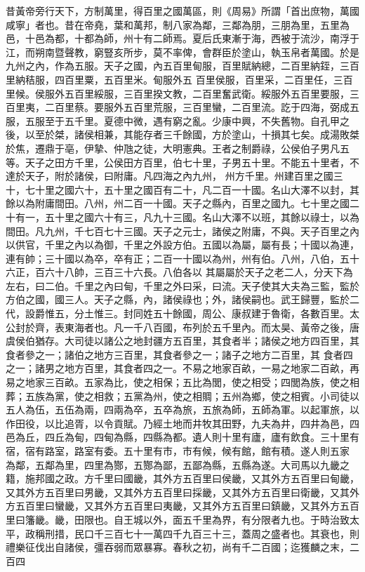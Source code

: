 \begin{pinyinscope}
 昔黃帝旁行天下，方制萬里，得百里之國萬區，則《周易》所謂「首出庶物，萬國咸寧」者也。昔在帝堯，葉和萬邦，制八家為鄰，三鄰為朋，三朋為里，五里為邑，十邑為都，十都為師，州十有二師焉。夏后氏東漸于海，西被于流沙，南浮于江，而朔南暨聲教，窮豎亥所步，莫不率俾，會群臣於塗山，執玉帛者萬國。於是九州之內，作為五服。天子之國，內五百里甸服，百里賦納總，二百里納銍，三百里納秸服，四百里粟，五百里米。甸服外五
 百里侯服，百里采，二百里任，三百里候。侯服外五百里綏服，三百里揆文教，二百里奮武衛。綏服外五百里要服，三百里夷，二百里蔡。要服外五百里荒服，三百里蠻，二百里流。訖于四海，弼成五服，五服至于五千里。夏德中微，遇有窮之亂。少康中興，不失舊物。自孔甲之後，以至於桀，諸侯相兼，其能存者三千餘國，方於塗山，十損其七矣。成湯敗桀於焦，遷鼎于亳，伊摯、仲虺之徒，大明憲典。王者之制爵祿，公侯伯子男凡五等。天子之田方千里，公侯田方百里，伯七十里，子男五十里。不能五十里者，不達於天子，附於諸侯，曰附庸。凡四海之內九州，
 州方千里。州建百里之國三十，七十里之國六十，五十里之國百有二十，凡二百一十國。名山大澤不以封，其餘以為附庸間田。八州，州二百一十國。天子之縣內，百里之國九。七十里之國二十有一，五十里之國六十有三，凡九十三國。名山大澤不以班，其餘以祿士，以為間田。凡九州，千七百七十三國。天子之元士，諸侯之附庸，不與。天子百里之內以供官，千里之內以為御，千里之外設方伯。五國以為屬，屬有長；十國以為連，連有帥；三十國以為卒，卒有正；二百一十國以為州，州有伯。八州，八伯，五十六正，百六十八帥，三百三十六長。八伯各以
 其屬屬於天子之老二人，分天下為左右，曰二伯。千里之內曰甸，千里之外曰采，曰流。天子使其大夫為三監，監於方伯之國，國三人。天子之縣，內，諸侯祿也；外，諸侯嗣也。武王歸豐，監於二代，設爵惟五，分土惟三。封同姓五十餘國，周公、康叔建于魯衛，各數百里。太公封於齊，表東海者也。凡一千八百國，布列於五千里內。而太昊、黃帝之後，唐虞侯伯猶存。大司徒以諸公之地封疆方五百里，其食者半；諸侯之地方四百里，其食者參之一；諸伯之地方三百里，其食者參之一；諸子之地方二百里，其
 食者四之一；諸男之地方百里，其食者四之一。不易之地家百畝，一易之地家二百畝，再易之地家三百畝。五家為比，使之相保；五比為閭，使之相受；四閭為族，使之相葬；五族為黨，使之相救；五黨為州，使之相賙；五州為鄉，使之相賓。小司徒以五人為伍，五伍為兩，四兩為卒，五卒為旅，五旅為師，五師為軍。以起軍旅，以作田役，以比追胥，以令貢賦。乃經土地而井牧其田野，九夫為井，四井為邑，四邑為丘，四丘為甸，四甸為縣，四縣為都。遺人則十里有廬，廬有飲食。三十里有宿，宿有路室，路室有委。五十里有市，市有候，候有館，館有積。遂人則五家
 為鄰，五鄰為里，四里為酂，五酂為鄙，五鄙為縣，五縣為遂。大司馬以九畿之籍，施邦國之政。方千里曰國畿，其外方五百里曰侯畿，又其外方五百里曰甸畿，又其外方五百里曰男畿，又其外方五百里曰採畿，又其外方五百里曰衛畿，又其外方五百里曰蠻畿，又其外方五百里曰夷畿，又其外方五百里曰鎮畿，又其外方五百里曰籓畿。畿，田限也。自王城以外，面五千里為界，有分限者九也。于時治致太平，政稱刑措，民口千三百七十一萬四千九百三十三，蓋周之盛者也。其衰也，則禮樂征伐出自諸侯，彊吞弱而眾暴寡。春秋之初，尚有千二百國；迄獲麟之末，二百四

\end{pinyinscope}
